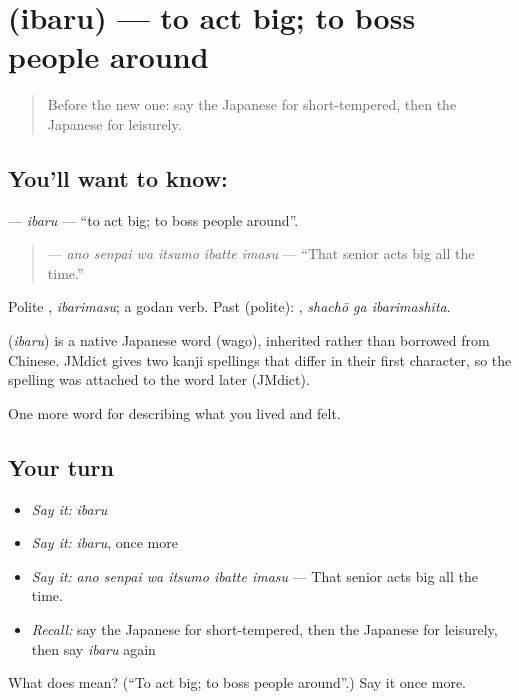 \section[\texorpdfstring{\ja{いばる} (ibaru)}{いばる (ibaru)}]{ (ibaru) — to act big; to boss people around}

\label{lesson:JA-C438-ibaru}



\begin{quote}
Before the new one: say the Japanese for short-tempered, then the Japanese for leisurely.
\end{quote}

\subsection*{You'll want to know: }
\textbf{} — \emph{ibaru} — \textquotedblleft{}to act big; to boss people around\textquotedblright{}.

\begin{quote}
\textbf{   } — \emph{ano senpai wa itsumo ibatte imasu} — \textquotedblleft{}That senior acts big all the time.\textquotedblright{}
\end{quote}

Polite \textbf{}, \emph{ibarimasu}; a godan verb. Past (polite): \textbf{ }, \emph{shachō ga ibarimashita}.

\begin{cousinweb}
\textbf{} (\emph{ibaru}) is a native Japanese word (wago), inherited rather than borrowed from Chinese. JMdict gives two kanji spellings that differ in their first character, so the spelling was attached to the word later (JMdict).
\end{cousinweb}

\begin{grammarlens}[title={What you've built}]
One more word for describing what you lived and felt.
\end{grammarlens}

\subsection*{Your turn}
\begin{itemize}
\raggedright
  \item \emph{Say it:} \emph{ibaru}
  \item \emph{Say it:} \emph{ibaru}, once more
  \item \emph{Say it:} \emph{ano senpai wa itsumo ibatte imasu} — That senior acts big all the time.
  \item \emph{Recall:} say the Japanese for short-tempered, then the Japanese for leisurely, then say \emph{ibaru} again
\end{itemize}

\begin{tcolorbox}[breakable,colback=teal!4,colframe=teal!35!black,title={Before you move on}]
What does  mean? (\textquotedblleft{}To act big; to boss people around\textquotedblright{}.) Say it once more.
\end{tcolorbox}
